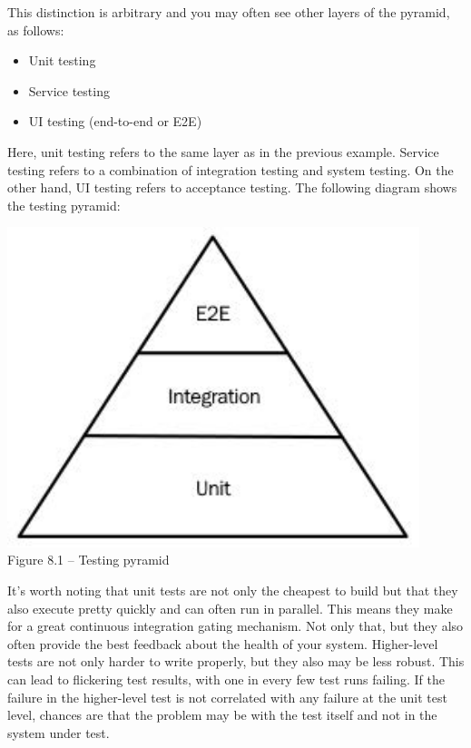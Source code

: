 This distinction is arbitrary and you may often see other layers of the pyramid, as follows:

\begin{itemize}
\item 
Unit testing

\item 
Service testing

\item 
UI testing (end-to-end or E2E)
\end{itemize}

Here, unit testing refers to the same layer as in the previous example. Service testing refers to a combination of integration testing and system testing. On the other hand, UI testing refers to acceptance testing. The following diagram shows the testing pyramid:

\begin{center}
\includegraphics[width=0.9\textwidth]{content/3/chapter8/images/1.jpg}\\
Figure 8.1 – Testing pyramid
\end{center}

It's worth noting that unit tests are not only the cheapest to build but that they also execute pretty quickly and can often run in parallel. This means they make for a great continuous integration gating mechanism. Not only that, but they also often provide the best feedback about the health of your system. Higher-level tests are not only harder to write properly, but they also may be less robust. This can lead to flickering test results, with one in every few test runs failing. If the failure in the higher-level test is not correlated with any failure at the unit test level, chances are that the problem may be with the test itself and not in the system under test.

